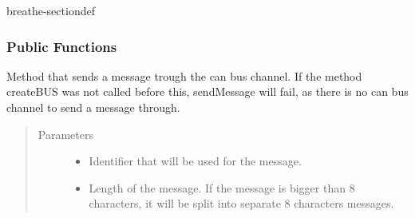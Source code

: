 \documentclass[a4paper,10pt,english]{sphinxmanual}
\begin{document}

\begin{fulllineitems}
\label{\detokenize{classestracing:_CPPv49STCanScan}}%
\pysigstartmultiline
{}%
\pysigstopmultiline
\begin{sphinxuseclass}{breathe-sectiondef}\subsubsection*{Public Functions}

\begin{fulllineitems}
\label{\detokenize{classestracing:_CPPv4N9STCanScan11sendMessageEshPhb}}%
\pysigstartmultiline
{}%
\pysigstopmultiline
\sphinxAtStartPar
Method that sends a message trough the can bus channel. If the method createBUS was not called before this, sendMessage will fail, as there is no can bus channel to send a message through.
\begin{quote}\begin{description}
\item[{Parameters}] \leavevmode\begin{itemize}
\item {} 
\sphinxAtStartPar
{} \textendash{} Identifier that will be used for the message. 

\item {} 
\sphinxAtStartPar
{} \textendash{} Length of the message. If the message is bigger than 8 characters, it will be split into separate 8 characters messages. 


\end{itemize}
\end{description}
\end{quote}
\end{fulllineitems}
\end{sphinxuseclass}
\end{fulllineitems}
\end{document}
